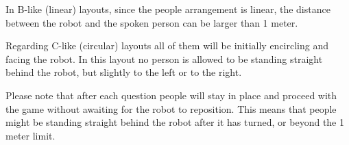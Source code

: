 In B-like (linear) layouts, since the people arrangement is linear, the distance between the robot and the spoken person can be larger than 1 meter.

Regarding C-like (circular) layouts all of them will be initially encircling and facing the robot. In this layout no person is allowed to be standing straight behind the robot, but slightly to the left or to the right.

Please note that after each question people will stay in place and proceed with the game without awaiting for the robot to reposition. This means that people might be standing straight behind the robot after it has turned, or beyond the 1 meter limit.